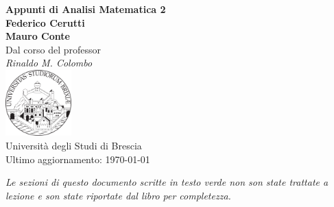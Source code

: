 \documentclass[a4paper,twoside,italian]{book}
\begin{document}
\pagestyle{headings}

\frontmatter
\begin{titlepage}
	\begin{center}
		{\huge\bfseries Appunti di Analisi Matematica 2\\}
		\vspace{1.5cm}
		{\Large\bfseries Federico Cerutti\\Mauro Conte\\}
		\vspace{2cm}
		{Dal corso del professor}\\[5pt]
		\emph{{Rinaldo M. Colombo}}\\[2cm]
		\vfill
		\includegraphics[width=0.19\textwidth]{unibs-logo.png}\\[5pt]
		{Università degli Studi di Brescia}\\[10pt]
		{Ultimo aggiornamento: \today}
	\end{center}
\end{titlepage}

\begin{center}
\itshape
Le sezioni di questo documento scritte in testo \textcolor{not_explained_section_color}{verde} non son state trattate a lezione e son state riportate dal libro per completezza.
\end{center}
\vfill
\doclicenseThis

\newpage
{}
\tableofcontents


\mainmatter








\backmatter
\end{document}
